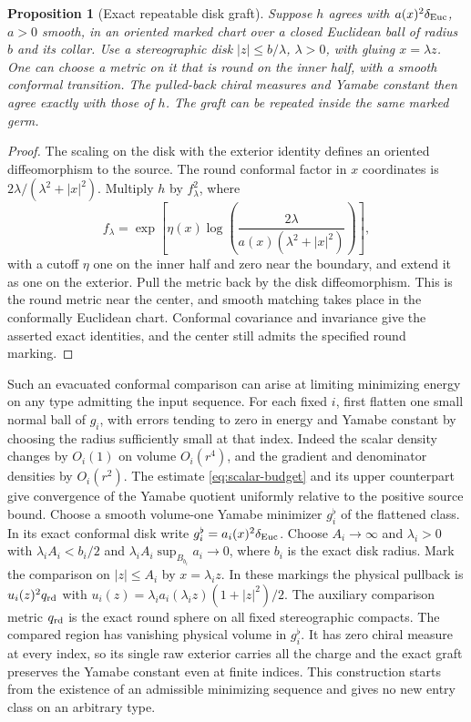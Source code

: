 \documentclass[11pt,letterpaper]{article}
\numberwithin{equation}{section}
\newtheorem{proposition}[theorem]{Proposition}
\theoremstyle{remark}
\newcommand{\Eucl}{\delta_{\rm Euc}}
\begin{document}
\begin{proposition}[Exact repeatable disk graft]\label{prop:graft}
Suppose \(h\) agrees with \(a(x)^2\Eucl\), \(a>0\) smooth, in an
oriented marked chart over a closed Euclidean ball of radius \(b\)
and its collar. Use a stereographic disk \(|z|\le b/\lambda\),
\(\lambda>0\), with gluing \(x=\lambda z\). One can choose a metric
on it that is round on the inner half, with a smooth conformal
transition. The pulled-back chiral measures and Yamabe constant
then agree exactly with those of \(h\). The graft can be
repeated inside the same marked germ.
\end{proposition}
\begin{proof}
The scaling on the disk with the exterior identity defines an
oriented diffeomorphism to the source. The round conformal factor
in \(x\) coordinates is \(2\lambda/(\lambda^2+|x|^2)\).
Multiply \(h\) by \(f_\lambda^2\), where
\[
 f_\lambda=\exp\!\left[\eta(x)
     \log\!\left(\frac{2\lambda}{a(x)(\lambda^2+|x|^2)}\right)\right],
\]
with a cutoff \(\eta\) one on the inner half and zero near the
boundary, and extend it as one on the exterior. Pull the metric
back by the disk diffeomorphism. This is the round metric near
the center, and smooth matching takes place in the
conformally Euclidean chart. Conformal covariance and invariance
give the asserted exact identities, and the center still admits
the specified round marking.
\end{proof}

Such an evacuated conformal comparison can arise at limiting
minimizing energy on any type admitting the input sequence.
For each fixed \(i\), first flatten one small normal ball of
\(g_i\), with errors tending to zero in energy and Yamabe constant
by choosing the radius sufficiently small at that index.
Indeed the scalar density changes by \(O_i(1)\) on volume
\(O_i(r^4)\), and the gradient and denominator densities by
\(O_i(r^2)\). The estimate \eqref{eq:scalar-budget} and its
upper counterpart give convergence of the Yamabe quotient
uniformly relative to the positive source bound. Choose a smooth
volume-one Yamabe minimizer \(g_i^\flat\) of the flattened class.
In its exact conformal disk write \(g_i^\flat=a_i(x)^2\Eucl\).
Choose \(A_i\to\infty\) and \(\lambda_i>0\) with
\(\lambda_i A_i<b_i/2\) and
\(\lambda_i A_i\sup_{B_{b_i}}a_i\to0\), where \(b_i\) is the
exact disk radius. Mark the comparison on \(|z|\le A_i\)
by \(x=\lambda_i z\). In these markings the physical pullback
is \(u_i(z)^2q_{\rm rd}\) with
\(u_i(z)=\lambda_i a_i(\lambda_i z)(1+|z|^2)/2\).
The auxiliary comparison metric \(q_{\rm rd}\) is the exact
round sphere on all fixed stereographic compacts. The compared
region has vanishing physical volume in \(g_i^\flat\).
It has zero chiral measure at every index, so its
single raw exterior carries all the charge and the exact graft
preserves the Yamabe constant even at finite indices. This
construction starts from the existence of an admissible
minimizing sequence and gives no new entry class on an arbitrary
type.
\end{document}
